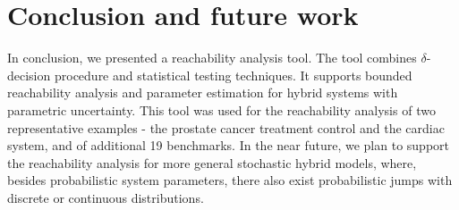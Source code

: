 \section{Conclusion and future work}
In conclusion, we presented a reachability analysis tool. The tool combines $\delta$-decision procedure \cite{gao2013dreal, gao2013satisfiability, gaodelta} and statistical testing techniques. It supports bounded reachability analysis and parameter estimation for hybrid systems with parametric uncertainty. This tool was used for the reachability analysis of two representative examples - the prostate cancer treatment control and the cardiac system, and of additional 19 benchmarks. In the near future, we plan to support the reachability analysis for more general stochastic hybrid models, where, besides probabilistic system parameters, there also exist probabilistic jumps with discrete or continuous distributions. 
